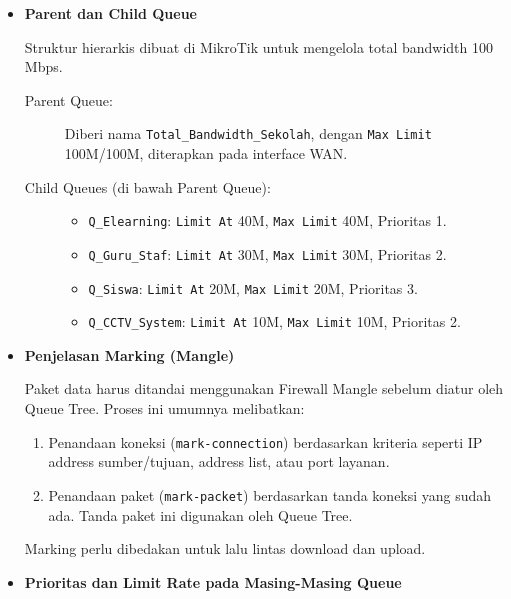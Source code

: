 \begin{enumerate}
    \begin{itemize}
        \item \textbf{Parent dan Child Queue}
        
        Struktur hierarkis dibuat di MikroTik untuk mengelola total bandwidth 100 Mbps.
        \begin{description}
            \item[Parent Queue:] Diberi nama \texttt{Total\_Bandwidth\_Sekolah}, dengan \texttt{Max Limit} 100M/100M, diterapkan pada interface WAN.
            \item[Child Queues (di bawah Parent Queue):]
            \begin{itemize}
                \item \texttt{Q\_Elearning}: \texttt{Limit At} 40M, \texttt{Max Limit} 40M, Prioritas 1.
                \item \texttt{Q\_Guru\_Staf}: \texttt{Limit At} 30M, \texttt{Max Limit} 30M, Prioritas 2.
                \item \texttt{Q\_Siswa}: \texttt{Limit At} 20M, \texttt{Max Limit} 20M, Prioritas 3.
                \item \texttt{Q\_CCTV\_System}: \texttt{Limit At} 10M, \texttt{Max Limit} 10M, Prioritas 2.
            \end{itemize}
        \end{description}

        \item \textbf{Penjelasan Marking (Mangle)}
        
        Paket data harus ditandai menggunakan Firewall Mangle sebelum diatur oleh Queue Tree. Proses ini umumnya melibatkan:
        \begin{enumerate}
            \item Penandaan koneksi (\texttt{mark-connection}) berdasarkan kriteria seperti IP address sumber/tujuan, address list, atau port layanan.
            \item Penandaan paket (\texttt{mark-packet}) berdasarkan tanda koneksi yang sudah ada. Tanda paket ini digunakan oleh Queue Tree.
        \end{enumerate}
        Marking perlu dibedakan untuk lalu lintas download dan upload.

        \item \textbf{Prioritas dan Limit Rate pada Masing-Masing Queue}
        

\end{itemize}
\end{enumerate}
